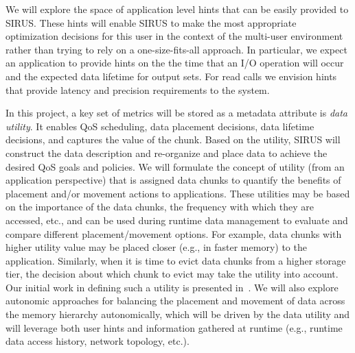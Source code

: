 We will explore the space of application level hints that can be easily provided
to SIRUS. These hints will enable SIRUS to make the
most appropriate optimization decisions for this user in the context of the
multi-user environment rather than trying to rely on a one-size-fits-all
approach. In particular, we expect an application to provide hints on the
the time that an I/O operation will occur and
the expected data lifetime for output sets. For read calls we envision
hints that provide latency and precision requirements to the system. 

In this project, a key set of metrics will be stored as a metadata
attribute is \textit{data utility}.  It enables QoS scheduling, data placement
decisions, data lifetime decisions, and captures the value of the chunk.
Based on the utility, SIRUS will construct the data description and re-organize and place data to
achieve the desired QoS goals and policies.
 We will formulate the concept of utility (from an
application perspective) that is assigned data chunks to quantify the
benefits of placement and/or movement actions to applications. These
utilities may be based on the importance of the data chunks, the frequency
with which they are accessed, etc., and can be used during runtime data
management to evaluate and compare different placement/movement options. 
For example, data chunks with higher utility value may be
placed closer (e.g., in faster memory) to the application.
Similarly, when it is time to evict data chunks from a higher storage
tier, the decision about which chunk to evict may take the utility into
account. Our initial work in defining such a utility is presented in~\cite{tongipdps15}.
 We will also explore autonomic approaches for balancing the placement and 
 movement of data across the memory hierarchy autonomically, which will be driven 
 by the data utility and will leverage both user hints and information gathered at runtime (e.g., runtime data access
history, network topology, etc.).

